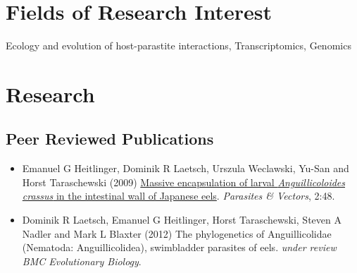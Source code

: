 %

\section*{Fields of Research Interest}

Ecology and evolution of host-parastite interactions, Transcriptomics, Genomics

\section*{Research}

\subsection*{Peer Reviewed Publications}

\begin{itemize}
\item Emanuel G Heitlinger, Dominik R Laetsch, Urszula Weclawski,
  Yu-San and Horst Taraschewski (2009)
  \href{http://www.parasitesandvectors.com/content/2/1/48}{Massive
    encapsulation of larval \textit{Anguillicoloides crassus} in the
    intestinal wall of Japanese eels}. \textit{Parasites \& Vectors},
  2:48.
\item Dominik R Laetsch, Emanuel G Heitlinger, Horst Taraschewski,
  Steven A Nadler and Mark L Blaxter (2012) The phylogenetics of
  Anguillicolidae (Nematoda: Anguillicolidea), swimbladder parasites
  of eels. \textit{under review} \textit{BMC Evolutionary Biology}.
\end{itemize}

%



